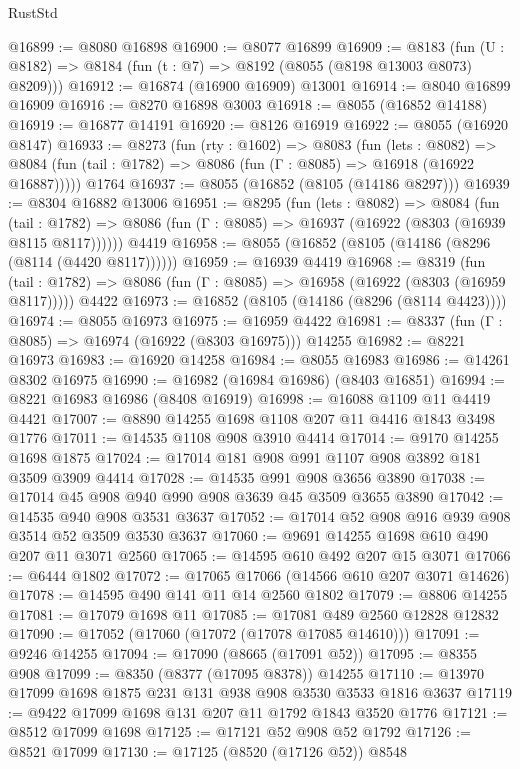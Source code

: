 \begin{lexlean}{RustStd}
\begin{coremodule}
@16899 := @8080 @16898
@16900 := @8077 @16899
@16909 := @8183
    (fun (U : @8182) => @8184 (fun (t : @7) => @8192 (@8055 (@8198 @13003 @8073) @8209)))
@16912 := @16874 (@16900 @16909) @13001
@16914 := @8040 @16899 @16909
@16916 := @8270 @16898 @3003
@16918 := @8055 (@16852 @14188)
@16919 := @16877 @14191
@16920 := @8126 @16919
@16922 := @8055 (@16920 @8147)
@16933 := @8273
    (fun (rty : @1602) =>
    @8083
      (fun (lets : @8082) =>
      @8084 (fun (tail : @1782) => @8086 (fun (Γ : @8085) => @16918 (@16922 @16887)))))
    @1764
@16937 := @8055 (@16852 (@8105 (@14186 @8297)))
@16939 := @8304 @16882 @13006
@16951 := @8295
    (fun (lets : @8082) =>
    @8084
      (fun (tail : @1782) =>
      @8086 (fun (Γ : @8085) => @16937 (@16922 (@8303 (@16939 @8115 @8117))))))
    @4419
@16958 := @8055 (@16852 (@8105 (@14186 (@8296 (@8114 (@4420 @8117))))))
@16959 := @16939 @4419
@16968 := @8319
    (fun (tail : @1782) => @8086 (fun (Γ : @8085) => @16958 (@16922 (@8303 (@16959 @8117)))))
    @4422
@16973 := @16852 (@8105 (@14186 (@8296 (@8114 @4423))))
@16974 := @8055 @16973
@16975 := @16959 @4422
@16981 := @8337 (fun (Γ : @8085) => @16974 (@16922 (@8303 @16975))) @14255
@16982 := @8221 @16973
@16983 := @16920 @14258
@16984 := @8055 @16983
@16986 := @14261 @8302 @16975
@16990 := @16982 (@16984 @16986) (@8403 @16851)
@16994 := @8221 @16983 @16986 (@8408 @16919)
@16998 := @16088 @1109 @11 @4419 @4421
@17007 := @8890 @14255 @1698 @1108 @207 @11 @4416 @1843 @3498 @1776
@17011 := @14535 @1108 @908 @3910 @4414
@17014 := @9170 @14255 @1698 @1875
@17024 := @17014 @181 @908 @991 @1107 @908 @3892 @181 @3509 @3909 @4414
@17028 := @14535 @991 @908 @3656 @3890
@17038 := @17014 @45 @908 @940 @990 @908 @3639 @45 @3509 @3655 @3890
@17042 := @14535 @940 @908 @3531 @3637
@17052 := @17014 @52 @908 @916 @939 @908 @3514 @52 @3509 @3530 @3637
@17060 := @9691 @14255 @1698 @610 @490 @207 @11 @3071 @2560
@17065 := @14595 @610 @492 @207 @15 @3071
@17066 := @6444 @1802
@17072 := @17065 @17066 (@14566 @610 @207 @3071 @14626)
@17078 := @14595 @490 @141 @11 @14 @2560 @1802
@17079 := @8806 @14255
@17081 := @17079 @1698 @11
@17085 := @17081 @489 @2560 @12828 @12832
@17090 := @17052 (@17060 (@17072 (@17078 @17085 @14610)))
@17091 := @9246 @14255
@17094 := @17090 (@8665 (@17091 @52))
@17095 := @8355 @908
@17099 := @8350 (@8377 (@17095 @8378)) @14255
@17110 := @13970 @17099 @1698 @1875 @231 @131 @938 @908 @3530 @3533 @1816 @3637
@17119 := @9422 @17099 @1698 @131 @207 @11 @1792 @1843 @3520 @1776
@17121 := @8512 @17099 @1698
@17125 := @17121 @52 @908 @52 @1792
@17126 := @8521 @17099
@17130 := @17125 (@8520 (@17126 @52)) @8548

\end{coremodule}
\end{lexlean}
